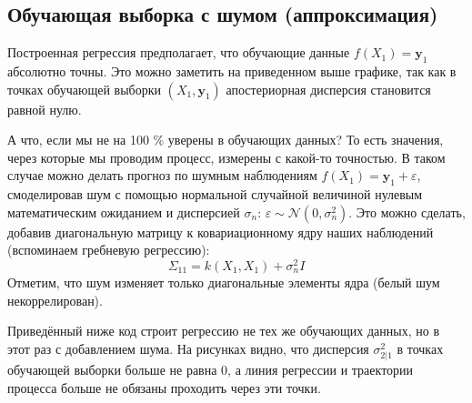 \documentclass[11pt,a4paper]{article}
\begin{document}
    \hypertarget{ux43eux431ux443ux447ux430ux44eux449ux430ux44f-ux432ux44bux431ux43eux440ux43aux430-ux441-ux448ux443ux43cux43eux43c-ux430ux43fux43fux440ux43eux43aux441ux438ux43cux430ux446ux438ux44f}{%
\subsection{Обучающая выборка с шумом
(аппроксимация)}\label{ux43eux431ux443ux447ux430ux44eux449ux430ux44f-ux432ux44bux431ux43eux440ux43aux430-ux441-ux448ux443ux43cux43eux43c-ux430ux43fux43fux440ux43eux43aux441ux438ux43cux430ux446ux438ux44f}}

    Построенная регрессия предполагает, что обучающие данные
\(f(X_1) = \mathbf{y}_1\) абсолютно точны. Это можно заметить на
приведенном выше графике, так как в точках обучающей выборки
\((X_1,\mathbf{y}_1)\) апостериорная дисперсия становится равной нулю.

А что, если мы не на 100 \% уверены в обучающих данных? То есть
значения, через которые мы проводим процесс, измерены с какой-то
точностью. В таком случае можно делать прогноз по шумным наблюдениям
\(f(X_1) = \mathbf{y}_1 + \varepsilon\), смоделировав шум с помощью
нормальной случайной величиной нулевым математическим ожиданием и дисперсией
\(\sigma_n\): \(\varepsilon \sim \mathcal{N}(0, \sigma_n^2)\).
Это можно сделать, добавив диагональную матрицу к ковариационному ядру
наших наблюдений (вспоминаем гребневую регрессию):
\[
  \Sigma_{11} = k(X_1,X_1) + \sigma_n^2 I
\]
Отметим, что шум изменяет только диагональные элементы ядра (белый шум
некоррелирован).

Приведённый ниже код строит регрессию не тех же обучающих данных, но в
этот раз с добавлением шума.
На рисунках видно, что дисперсия \(\sigma_{2|1}^2\) в точках обучающей
выборки больше не равна 0, а линия регрессии и траектории процесса
больше не обязаны проходить через эти точки.
\end{document}
